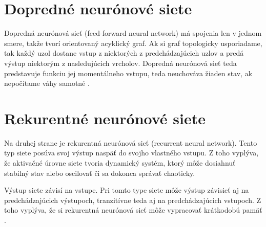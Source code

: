 \section{Dopredné neurónové siete}
Dopredná neurónová sieť (feed-forward neural network) má spojenia len v jednom smere, takže tvorí orientovaný acyklický graf.
Ak si graf topologicky usporiadame, tak každý uzol dostane vstup z niektorých z predchádzajúcich uzlov a predá výstup niektorým z nasledujúcich vrcholov.
Dopredná neurónová sieť teda predstavuje funkciu jej momentálneho vstupu, teda neuchováva žiaden stav, ak nepočítame váhy samotné \citep{aima}.

\section{Rekurentné neurónové siete}
Na druhej strane je rekurentná neurónová sieť (recurrent neural network).
Tento typ siete posúva svoj výstup naspäť do svojho vlastného vstupu. 
Z toho vyplýva, že aktivačné úrovne siete tvoria dynamický systém, ktorý môže dosiahnuť stabilný stav alebo oscilovať či sa dokonca správať chaoticky.

Výstup siete závisí na vstupe. 
Pri tomto type siete môže výstup závisieť aj na predchádzajúcich výstupoch, tranzitívne teda aj na predchádzajúcich vstupoch.
Z toho vyplýva, že si rekurentná neurónová sieť môže vypracovať krátkodobú pamäť \citep{aima}.